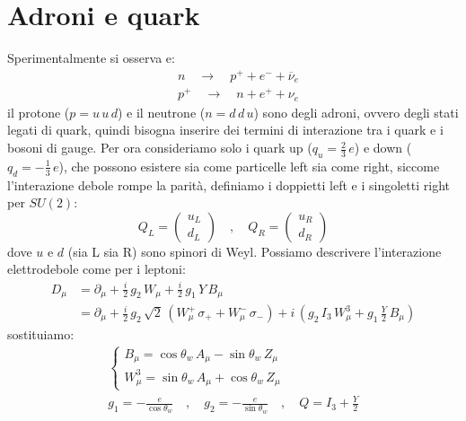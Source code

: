 \section{Adroni e quark}

Sperimentalmente si osserva e:
\begin{align*}
    &n\quad \longrightarrow \quad p^+ + e^- + \overline{\nu}_e \\
    &p^+ \quad \longrightarrow \quad n + e^+ + \nu_e
\end{align*}
il protone ($p=u\, u\, d$) e il neutrone ($n=d\, d\, u$) sono degli adroni, ovvero degli stati legati di quark, quindi bisogna inserire dei termini di interazione tra i quark e i bosoni di gauge. Per ora consideriamo solo i quark up ($q_u = \frac{2}{3}\, e$) e down ($q_d = -\frac{1}{3}\, e$), che possono esistere sia come particelle left sia come right, siccome l'interazione debole rompe la parità, definiamo i doppietti left e i singoletti right per $SU(2)$:
\begin{equation}
    Q_L = \begin{pmatrix}
        u_L \\
        d_L
    \end{pmatrix}\quad , \quad Q_R = \begin{pmatrix}
        u_R \\
        d_R
    \end{pmatrix}
\end{equation}
dove $u$ e $d$ (sia L sia R) sono spinori di Weyl. Possiamo descrivere l'interazione elettrodebole come per i leptoni:
\begin{align}
    D_\mu &= \partial_\mu + \frac{i}{2}\, g_2\, W_\mu + \frac{i}{2}\, g_1\, Y\, B_\mu \\
    &= \partial_\mu + \frac{i}{2}\, g_2\, \sqrt{2}\, \left(W_\mu^+\, \sigma_+ + W_\mu^-\, \sigma_-\right) + i\, \left( g_2\, I_3\, W_\mu^3 + g_1\, \frac{Y}{2}\, B_\mu \right) \label{eqn:5 interazione elettrodebole}
\end{align}
sostituiamo:
\begin{gather}
    \begin{cases}
        B_\mu = \cos\theta_w\, A_\mu - \sin\theta_w\, Z_\mu \\
        W_\mu^3 = \sin\theta_w\, A_\mu + \cos\theta_w\, Z_\mu
    \end{cases} \\
    g_1 = -\frac{e}{\cos\theta_w} \quad , \quad g_2 = -\frac{e}{\sin\theta_w} \quad , \quad Q = I_3 + \frac{Y}{2}
\end{gather}
